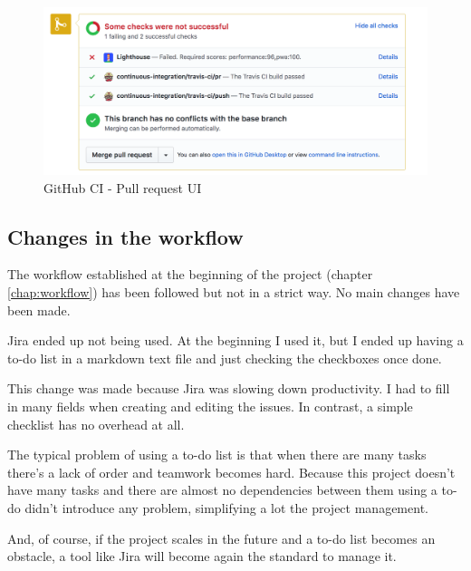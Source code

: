 \vfill
\begin{figure}[h!]
    \center
    \includegraphics[width=1\columnwidth]{media/github-ci.png}
    \caption[GitHub CI]{GitHub CI - Pull request UI}
    \label{github-ci}
\end{figure}
\vfill

\newpage
\subsection{Changes in the workflow}

The workflow established at the beginning of the project (chapter \ref{chap:workflow}) has been followed but not in a strict way. No main changes have been made.

Jira ended up not being used. At the beginning I used it, but I ended up having a to-do list in a markdown text file and just checking the checkboxes once done. 

This change was made because Jira was slowing down productivity. I had to fill in many fields when creating and editing the issues. In contrast, a simple checklist has no overhead at all. 

The typical problem of using a to-do list is that when there are many tasks there's a lack of order and teamwork becomes hard. Because this project doesn't have many tasks and there are almost no dependencies between them using a to-do didn't introduce any problem, simplifying a lot the project management. 

And, of course, if the project scales in the future and a to-do list becomes an obstacle, a tool like Jira will become again the standard to manage it.
